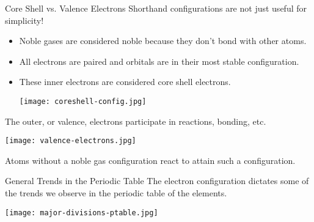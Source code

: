 \documentclass[handout]{beamer}
\begin{document}
\begin{frame}[allowframebreaks]{Core Shell vs. Valence Electrons}
	Shorthand configurations are not just useful for simplicity!
	\begin{itemize}
		\item Noble gases are considered noble because they don't bond
			with other atoms.
		\item All electrons are paired and orbitals are in their most
			stable configuration.
		\item These inner electrons are considered \alert{core shell}
			electrons.
			\smallskip
			\begin{center}
		\texttt{[image: coreshell-config.jpg]}
	\end{center}
	\end{itemize}

	\framebreak%

	The outer, or \alert{valence}, electrons participate in
	reactions, bonding, etc.
	\begin{center}
		\texttt{[image: valence-electrons.jpg]}
	\end{center}
	Atoms without a \alert{noble gas configuration} react to attain such a
	configuration.
\end{frame}


\begin{frame}{General Trends in the Periodic Table}
	The electron configuration dictates some of the trends we observe in the
	periodic table of the elements.
	\begin{center}
		\texttt{[image: major-divisions-ptable.jpg]}
	\end{center}
\end{frame}
\end{document}

